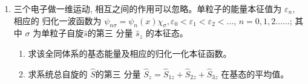 \begin{enumerate}
\begin{enumerate}
\end{enumerate}


\item 
三个电子做一维运动, 相互之间的作用可以忽略。单粒子的能量本征值为 $\varepsilon_{n}$, 相应的
归化一波函数为 $\psi_{n \sigma}=\psi_{n}(x) \chi_{\sigma} , \varepsilon_{0}<\varepsilon_{1}<\varepsilon_{2}<\ldots $,  $n=0,1,2 \ldots \ldots$; 其中 $\sigma$ 为单粒子自旋$ \hat{s} $的第三
分量 $\hat{s}_{z}$ 的本征态。
\begin{enumerate}
	\item
	求该全同体系的基态能量及相应的归化一化本征函数。 
	\item 
	求系统总自旋的 $\hat{S}$的第三 分量 $\hat{S}_{z}=\hat{S}_{1 z}+\hat{S}_{2 z}+\hat{S}_{3 z}$ 在基态的平均值。
	
	
	
\end{enumerate}


\end{enumerate}
